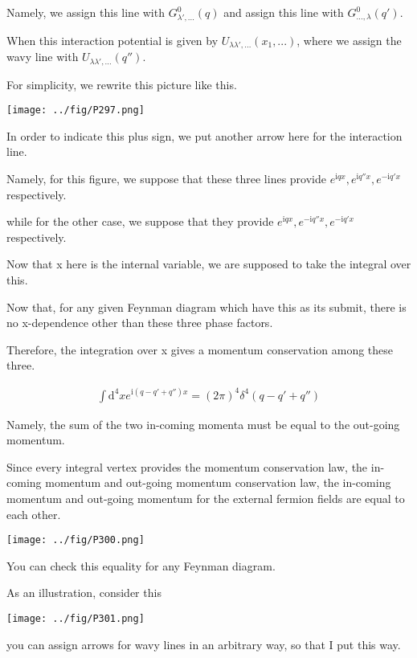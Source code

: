 Namely, we assign this line with $G_{\lambda',...}^0(q)$ and assign this line with $G_{...,\lambda}^0(q')$.

When this interaction potential is given by $U_{\lambda\lambda',...}(x_1,...)$, where we assign the wavy line with $U_{\lambda\lambda',...}(q'')$.


For simplicity, we rewrite this picture like this.
\begin{center}
\texttt{[image: ../fig/P297.png]}
\end{center}
In order to indicate this plus sign, we put another arrow here for the interaction line.

Namely, for this figure, we suppose that these three lines provide $e^{\mathrm{i}qx},e^{\mathrm{i}q''x},e^{-\mathrm{i}q'x}$ respectively.

while for the other case, we suppose that they provide $e^{\mathrm{i}qx},e^{-\mathrm{i}q''x},e^{-\mathrm{i}q'x}$ respectively.

Now that x here is the internal variable, we are supposed to take the integral over this.

Now that, for any given Feynman diagram which have this as its submit, there is no x-dependence other than these three phase factors.

Therefore, the integration over x gives a momentum conservation among these three.

\begin{align}
\int \mathrm{d}^4xe^{\mathrm{i}(q-q'+q'')x}=(2\pi)^4\delta^4(q-q'+q'') \nonumber
\end{align}

Namely, the sum of the two in-coming momenta must be equal to the out-going momentum.


Since every integral vertex provides the momentum conservation law, the in-coming momentum and out-going momentum conservation law, the in-coming momentum and out-going momentum for the external fermion fields are equal to each  other.
\begin{center}
\texttt{[image: ../fig/P300.png]}
\end{center}
You can check this equality for any Feynman diagram.

As an illustration, consider this 
\begin{center}
\texttt{[image: ../fig/P301.png]}
\end{center}
you can assign arrows for wavy lines in an arbitrary way, so that I put this way.

